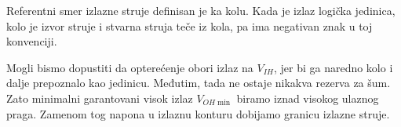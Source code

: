 Referentni smer izlazne struje definisan je ka kolu. Kada je izlaz logička jedinica, kolo je izvor struje i stvarna struja teče iz kola, pa ima negativan znak u toj konvenciji.

Mogli bismo dopustiti da opterećenje obori izlaz na $V_{IH}$, jer bi ga naredno kolo i dalje prepoznalo kao jedinicu. Međutim, tada ne ostaje nikakva rezerva za šum. Zato minimalni garantovani visok izlaz $V_{OH\min}$ biramo iznad visokog ulaznog praga. Zamenom tog napona u izlaznu konturu dobijamo granicu izlazne struje.
